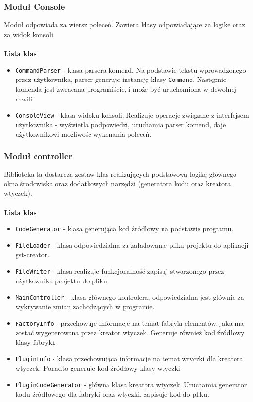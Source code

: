 \documentclass[12pt]{article}
\begin{document}
\subsubsection{Moduł Console}
Moduł odpowiada za wiersz poleceń. Zawiera klasy odpowiadające za logike oraz za widok konsoli. 
\paragraph{}
\textbf{Lista klas}
\vspace{-2mm}
\begin{itemize}
  \setlength{\itemsep}{0em}
\item \texttt{CommandParser} - klasa parsera komend. Na podstawie tekstu wprowadzonego przez użytkownika, parser generuje instancję klasy \texttt{Command}. Następnie komenda jest zwracana programiście, i może być uruchomiona w dowolnej chwili.
\item \texttt{ConsoleView} - klasa widoku konsoli. Realizuje operacje związane z interfejsem użytkownika - wyświetla podpowiedzi, uruchamia parser komend, daje użytkownikowi możliwość wykonania poleceń.
\end{itemize}
\subsubsection{Moduł controller}
Biblioteka ta dostarcza zestaw klas realizujących podstawową logikę głównego okna środowiska oraz dodatkowych narzędzi (generatora kodu oraz kreatora wtyczek). 
\paragraph{}
\textbf{Lista klas}
\vspace{-2mm}
\begin{itemize}
  \setlength{\itemsep}{0em}
\item \texttt{CodeGenerator} - klasa generująca kod źródłowy na podstawie programu.
\item \texttt{FileLoader} - klasa odpowiedzialna za załadowanie pliku projektu do aplikacji gst-creator.
\item \texttt{FileWriter} - klasa realizuje funkcjonalność zapisuj stworzonego przez użytkownika projektu do pliku.
\item \texttt{MainController} - klasa głównego kontrolera, odpowiedzialna jest głównie za wykrywanie zmian zachodzących w programie.
\item \texttt{FactoryInfo} - przechowuje informacje na temat fabryki elementów, jaka ma zostać wygenerowana przez kreator wtyczek. Generuje również kod źródłowy klasy fabryki.
\item \texttt{PluginInfo} - klasa przechowująca informacje na temat wtyczki dla kreatora wtyczek. Ponadto generuje kod źródłowy klasy wtyczki.
\item \texttt{PluginCodeGenerator} - główna klasa kreatora wtyczek. Uruchamia generator kodu źródłowego dla fabryki oraz wtyczki, zapisuje kod do pliku.
\end{itemize}
\end{document}
